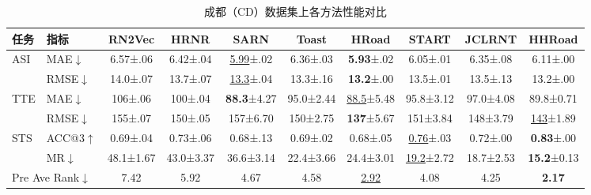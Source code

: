 \begin{table}[H]
    \centering
    \caption{成都（CD）数据集上各方法性能对比}
    \label{tab:HHRoad_cd}
    \small
    \setlength{\tabcolsep}{4pt}
    \renewcommand{\arraystretch}{1.2}
    \begin{tabular}{llcccccccc}
        \toprule
        \textbf{任务} & \textbf{指标}
            & \textbf{RN2Vec} & \textbf{HRNR} & \textbf{SARN}
            & \textbf{Toast} & \textbf{HRoad} & \textbf{START}
            & \textbf{JCLRNT} & \textbf{HHRoad} \\
        \midrule
        \multirow{2}{*}{ASI}
            & MAE$\downarrow$
            & 6.57\tiny{±.06} & 6.42\tiny{±.04} & \underline{5.99}\tiny{±.02}
            & 6.36\tiny{±.03} & \textbf{5.93}\tiny{±.02} & 6.05\tiny{±.01}
            & 6.35\tiny{±.08} & 6.11\tiny{±.00} \\
            & RMSE$\downarrow$
            & 14.0\tiny{±.07} & 13.7\tiny{±.07} & \underline{13.3}\tiny{±.04}
            & 13.3\tiny{±.16} & \textbf{13.2}\tiny{±.00} & 13.5\tiny{±.01}
            & 13.5\tiny{±.13} & 13.2\tiny{±.00} \\
        \cmidrule(lr){1-10}
        \multirow{2}{*}{TTE}
            & MAE$\downarrow$
            & 106\tiny{±.06} & 100\tiny{±.04} & \textbf{88.3}\tiny{±4.27}
            & 95.0\tiny{±2.44} & \underline{88.5}\tiny{±5.48} & 95.8\tiny{±3.12}
            & 97.0\tiny{±4.08} & 89.8\tiny{±0.71} \\
            & RMSE$\downarrow$
            & 155\tiny{±.07} & 150\tiny{±.05} & 157\tiny{±6.70}
            & 150\tiny{±2.75} & \textbf{137}\tiny{±5.67} & 151\tiny{±3.84}
            & 148\tiny{±3.79} & \underline{143}\tiny{±1.89} \\
        \cmidrule(lr){1-10}
        \multirow{2}{*}{STS}
            & ACC@3$\uparrow$
            & 0.69\tiny{±.04} & 0.73\tiny{±.06} & 0.68\tiny{±.13}
            & 0.69\tiny{±.02} & 0.68\tiny{±.05} & \underline{0.76}\tiny{±.03}
            & 0.72\tiny{±.00} & \textbf{0.83}\tiny{±.00} \\
            & MR$\downarrow$
            & 48.1\tiny{±1.67} & 43.0\tiny{±3.37} & 36.6\tiny{±3.14}
            & 22.4\tiny{±3.66} & 24.4\tiny{±3.01} & \underline{19.2}\tiny{±2.72}
            & 18.7\tiny{±2.53} & \textbf{15.2}\tiny{±0.13} \\
        \midrule
        \multicolumn{2}{l}{Pre Ave Rank$\downarrow$}
            & 7.42 & 5.92 & 4.67 & 4.58 & \underline{2.92} & 4.08 & 4.25 & \textbf{2.17} \\
        \bottomrule
    \end{tabular}
\end{table}

